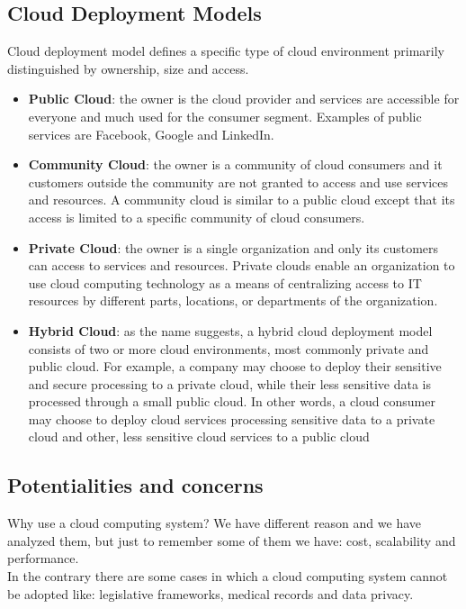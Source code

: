 \subsection{Cloud Deployment Models}
Cloud deployment model defines a specific type of cloud environment primarily distinguished by ownership, size and access.

\begin{itemize}
	\item \textbf{Public Cloud}: the owner is the cloud provider and services are accessible for everyone and much used for the consumer segment. Examples of public services are Facebook, Google and LinkedIn.
	
	\item  \textbf{Community Cloud}: the owner is a community of cloud consumers and it customers outside the community are not granted to access and use services and resources. A community cloud is similar to a public cloud except that its access is limited to a specific community of cloud consumers. 
	
	\item \textbf{Private Cloud}: the owner is a single organization and only its customers can access to services and resources. Private clouds enable an organization to use cloud computing technology as a means of centralizing access to IT resources by different parts, locations, or departments of the organization. 
	
	\item \textbf{Hybrid Cloud}: as the name suggests, a hybrid cloud deployment model consists of two or more cloud environments, most commonly private and public cloud. For example, a company may choose to deploy their sensitive and secure processing to a private cloud, while their less sensitive data is processed through a small public cloud. In other words, a cloud consumer may choose to deploy cloud services processing sensitive data to a private cloud and other, less sensitive cloud services to a public cloud
\end{itemize}


\subsection{Potentialities and concerns}
Why use a cloud computing system? We have different reason and we have analyzed them, but just to remember some of them we have: cost, scalability and performance.\\
In the contrary there are some cases in which a cloud computing system cannot be adopted like: legislative frameworks, medical records and data privacy.